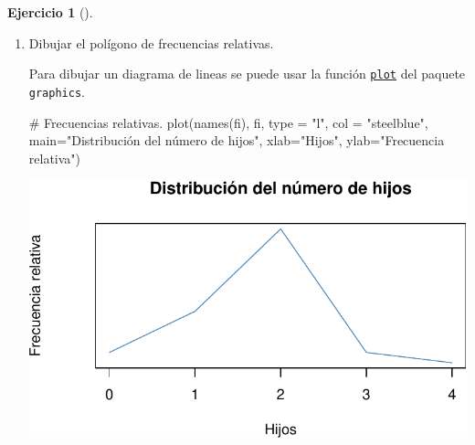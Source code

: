 \documentclass[
  a4paper,
]{scrreport}
\newenvironment{Shaded}{\begin{snugshade}}{\end{snugshade}}
\newcommand{\AttributeTok}[1]{\textcolor[rgb]{0.40,0.45,0.13}{#1}}
\newcommand{\CommentTok}[1]{\textcolor[rgb]{0.37,0.37,0.37}{#1}}
\newcommand{\FunctionTok}[1]{\textcolor[rgb]{0.28,0.35,0.67}{#1}}
\newcommand{\NormalTok}[1]{\textcolor[rgb]{0.00,0.23,0.31}{#1}}
\newcommand{\StringTok}[1]{\textcolor[rgb]{0.13,0.47,0.30}{#1}}
\theoremstyle{definition}
\newtheorem{exercise}{Ejercicio}[chapter]
\theoremstyle{remark}
\begin{document}
\begin{exercise}[]
\begin{enumerate}
\begin{tcolorbox}
  \end{tcolorbox}
\item
  Dibujar el polígono de frecuencias relativas.

  \begin{tcolorbox}[enhanced jigsaw, toprule=.15mm, rightrule=.15mm, arc=.35mm, colback=white, colbacktitle=quarto-callout-tip-color!10!white, toptitle=1mm, left=2mm, colframe=quarto-callout-tip-color-frame, opacityback=0, breakable, opacitybacktitle=0.6, bottomtitle=1mm, titlerule=0mm, title=\textcolor{quarto-callout-tip-color}{\faLightbulb}\hspace{0.5em}{Solución 1}, bottomrule=.15mm, coltitle=black, leftrule=.75mm]

  Para dibujar un diagrama de lineas se puede usar la función
  \href{https://www.rdocumentation.org/packages/graphics/versions/3.6.2/topics/plot}{\texttt{plot}}
  del paquete \texttt{graphics}.

\begin{Shaded}
\begin{Highlighting}[]
\CommentTok{\# Frecuencias relativas.}
\FunctionTok{plot}\NormalTok{(}\FunctionTok{names}\NormalTok{(fi), fi, }\AttributeTok{type =} \StringTok{"l"}\NormalTok{, }\AttributeTok{col =} \StringTok{"steelblue"}\NormalTok{, }\AttributeTok{main=}\StringTok{"Distribución del número de hijos"}\NormalTok{, }\AttributeTok{xlab=}\StringTok{"Hijos"}\NormalTok{, }\AttributeTok{ylab=}\StringTok{"Frecuencia relativa"}\NormalTok{)}
\end{Highlighting}
\end{Shaded}

  \includegraphics{03-frecuencias-graficos_files/figure-pdf/unnamed-chunk-8-1.pdf}

  \end{tcolorbox}


\end{enumerate}
\end{exercise}
\end{document}
